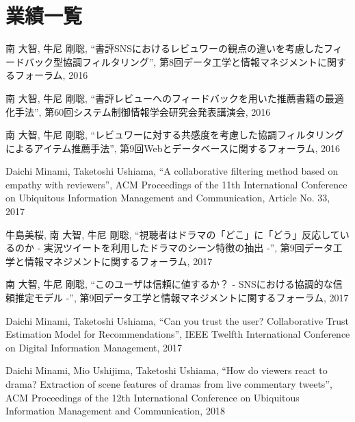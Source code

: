 \documentclass[a4paper,11pt,oneside,openany]{jsbook}
\begin{document}
\chapter*{業績一覧}
\begin{enumerate}[{[}1{]}]
\item 南 大智, 牛尼 剛聡, “書評SNSにおけるレビュワーの観点の違いを考慮したフィードバック型協調フィルタリング”, 第8回データ工学と情報マネジメントに関するフォーラム, 2016
\item 南 大智, 牛尼 剛聡, “書評レビューへのフィードバックを用いた推薦書籍の最適化手法”, 第60回システム制御情報学会研究会発表講演会, 2016
\item 南 大智, 牛尼 剛聡, “レビュワーに対する共感度を考慮した協調フィルタリングによるアイテム推薦手法”, 第9回Webとデータベースに関するフォーラム, 2016
\item Daichi Minami, Taketoshi Ushiama, “A collaborative filtering method based on empathy with reviewers”, ACM Proceedings of the 11th International Conference on Ubiquitous Information Management and Communication, Article No. 33, 2017
\item 牛島美桜, 南 大智, 牛尼 剛聡, “視聴者はドラマの「どこ」に「どう」反応しているのか - 実況ツイートを利用したドラマのシーン特徴の抽出 -”, 第9回データ工学と情報マネジメントに関するフォーラム, 2017
\item 南 大智, 牛尼 剛聡, “このユーザは信頼に値するか？ - SNSにおける協調的な信頼推定モデル -”,  第9回データ工学と情報マネジメントに関するフォーラム, 2017
\item Daichi Minami, Taketoshi Ushiama, “Can you trust the user? Collaborative Trust Estimation Model for Recommendations”, IEEE Twelfth International Conference on Digital Information Management, 2017
\item Daichi Minami, Mio Ushijima, Taketoshi Ushiama, “How do viewers react to drama? Extraction of scene features of dramas from live commentary tweets”, ACM Proceedings of the 12th International Conference on Ubiquitous Information Management and Communication, 2018

\end{enumerate}
\end{document}
